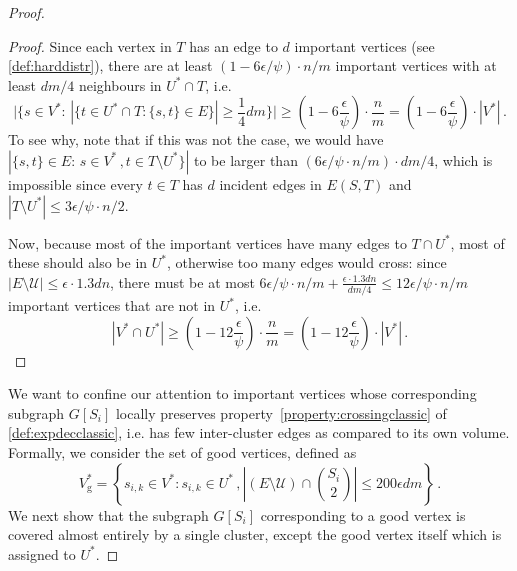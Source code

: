 \documentclass[epsfig,letter,11pt]{article}
\numberwithin{equation}{section}
\begin{document}
\begin{proof}
\begin{proof}
		Since each vertex in $T$ has an edge to $d$ important vertices (see \cref{def:harddistr}), there are at least $(1-6\epsilon/\psi) \cdot n/m$ important vertices with at least $dm/4$ neighbours in $U^* \cap T$, i.e.
		\begin{equation*}
			\Big|\Big\{s \in V^*: \, \left|\{t \in U^* \cap T: \{s,t\} \in E\}\right| \ge \frac{1}{4}dm\Big\}\Big| \ge  \left(1-6\frac{\epsilon}{\psi}\right) \cdot \frac{n}{m} = \left(1-6\frac{\epsilon}{\psi}\right)\cdot |V^*| \, .
		\end{equation*}
		To see why, note that if this was not the case, we would have $|\{s,t\} \in E:\, s \in V^*\, , t\in T \setminus U^* \}|$ to be larger than $ (6\epsilon/\psi \cdot n/m) \cdot dm/4$, which is impossible since every $t \in T$ has $d$ incident edges in $E(S,T)$ and $|T \setminus U^*| \le 3\epsilon/\psi \cdot n/2$.
		
		Now, because most of the important vertices have many edges to $T \cap U^*$, most of these should also be in $U^*$, otherwise too many edges would cross: since $|E \setminus \mathcal{U}| \le \epsilon \cdot 1.3 dn$, there must be at most $6\epsilon/\psi \cdot n/m+\frac{\epsilon \cdot 1.3 dn}{dm/4} \le 12\epsilon/\psi \cdot n/m$ important vertices that are not in $U^*$, i.e.
		\begin{equation*}
			|V^* \cap U^*| \ge \left(1-12\frac{\epsilon}{\psi}\right) \cdot \frac{n}{m}  =  \left(1-12\frac{\epsilon}{\psi}\right) \cdot |V^*| \, .
		\end{equation*}
	\end{proof}
	\noindent
	We want to confine our attention to important vertices whose corresponding subgraph $G[S_i]$ locally preserves property~\eqref{property:crossingclassic} of \cref{def:expdecclassic}, i.e. has few inter-cluster edges as compared to its own volume. Formally, we consider the set of good vertices, defined as
	\begin{equation}
		\label{eq:defgoodvertex}
		V^*_{\text{g}} = \left\{s_{i,k} \in V^* : s_{i,k} \in U^* \, , \left|(E \setminus \mathcal{U}) \cap \binom{S_i}{2}\right| \le {200\epsilon} dm\right\} \, .
	\end{equation}
	We next show that the subgraph $G[S_i]$ corresponding to a good vertex is covered almost entirely by a single cluster, except the good vertex itself which is assigned to $U^*$.
	

\end{proof}
\end{document}
